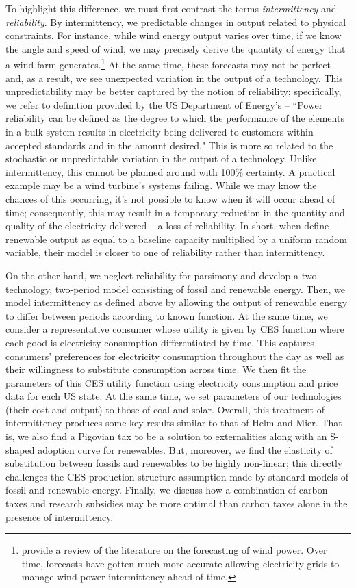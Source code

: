 \documentclass[11pt,a4paper]{extarticle}
\begin{document}
To highlight this difference, we must first contrast the terms  \textit{intermittency} and \textit{reliability}. By intermittency, we predictable changes in output related to physical constraints. For instance, while wind energy output varies over time, if  we know the angle and speed of wind, we may precisely derive the quantity of energy that a wind farm generates.\footnote{\citet{Foley2012} provide a review of the literature on the forecasting of wind power. Over time, forecasts have gotten much more accurate allowing electricity grids to manage wind power intermittency ahead of time.}  At the same time, these forecasts may not be perfect and, as a result, we see unexpected variation in the output of a technology. This unpredictability may be better captured by the notion of reliability; specifically,  we refer to definition provided by the US Department of Energy's \citep{ORNL} -- ``Power reliability can be defined as the degree to which the performance of the elements in a bulk system results in electricity being delivered to customers within accepted standards and in the amount desired." This is more so related to the stochastic or unpredictable variation in the output of a technology. Unlike intermittency, this cannot be planned around with 100\% certainty. A practical example may be a wind turbine's systems failing. While we may know the chances of this occurring, it's not possible to know when it will occur ahead of time; consequently, this may result in a temporary reduction in the quantity and quality of the electricity delivered --  a loss of reliability. In short, when \citeauthor{HH} define renewable output as equal to a baseline capacity multiplied by a uniform random variable, their model is closer to one of reliability rather than intermittency. 

On the other hand, we neglect reliability for parsimony and develop a two-technology, two-period model consisting of fossil and renewable energy. Then, we model intermittency as defined above by allowing the output of renewable energy to differ between periods according to known function. At the same time, we consider a representative consumer whose utility is given by CES function where each good is electricity consumption differentiated by time. This captures consumers' preferences for electricity consumption throughout the day as well as their willingness to substitute consumption across time. We then fit the parameters of this CES utility function using electricity consumption and price data for each US state. At the same time, we set parameters of our technologies (their cost and output) to those of coal and solar. Overall, this treatment of intermittency produces some key results similar to that of Helm and Mier. That is, we also find a Pigovian tax to be a solution to externalities along with an S-shaped adoption curve for renewables. But, moreover, we find the elasticity of substitution between fossils and renewables to be highly non-linear; this directly challenges the CES production structure assumption made by standard models of fossil and renewable energy. Finally, we discuss how a combination of carbon taxes and research subsidies may be more optimal than carbon taxes alone in the presence of intermittency. 
\end{document}
